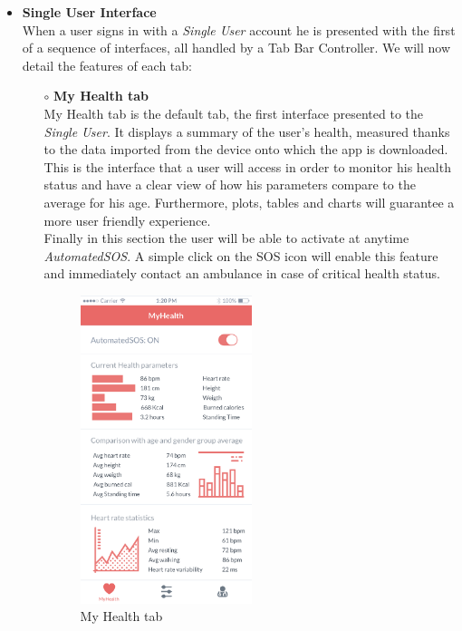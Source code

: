 \documentclass[titlepage]{article}
\begin{document}
\begin{itemize}
\begin{itemize}
				\item{\bf Single User Interface} \\
			When a user signs in with a {\it Single User} account he is presented with the first of a sequence of interfaces, all handled by a Tab Bar Controller. We will now detail the features of each tab:
				\begin{itemize}
					\item[$\circ$] {\bf My Health tab} \\
				My Health tab is the default tab, the first interface presented to the {\it Single User}. It displays a summary of the user’s health, measured thanks to the data imported from the device onto which the app is downloaded. This is the interface that a user will access in order to monitor his health status and have a clear view of how his parameters compare to the average for his age. Furthermore, plots, tables and charts will guarantee a more user friendly experience.\\
Finally in this section the user will be able to activate at anytime {\it AutomatedSOS}. A simple click on the SOS icon will enable this feature and immediately contact an ambulance in case of critical health status.\\
					\begin{figure}[H]
						\center
  						\includegraphics[width=5cm]{Mockup/mockupMyHealth.png}
  						\caption{My Health tab}
 					 	\label{fig:MyH}
					\end{figure}


\end{itemize}
\end{itemize}
\end{itemize}
\end{document}
